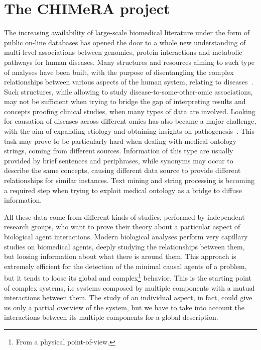 \documentclass{standalone}
\begin{document}
\section[CHIMeRA]{The CHIMeRA project}\label{chimera:chimera}

The increasing availability of large-scale biomedical literature under the form of public on-line databases has opened the door to a whole new understanding of multi-level associations between genomics, protein interactions and metabolic pathways for human diseases.
Many structures and resources aiming to such type of analyses have been built, with the purpose of disentangling the complex relationships between various aspects of the human system, relating to diseases~\cite{SymtomsNet, HumanPhenotype, chimerDB2017}.
Such structures, while allowing to study disease-to-some-other-omic associations, may not be sufficient when trying to bridge the gap of interpreting results and concepts proofing clinical studies, when many types of data are involved.
Looking for causation of diseases across different omics has also became a major challenge, with the aim of expanding etiology and obtaining insights on pathogenesis~\cite{Barabasi2007}.
This task may prove to be particularly hard when dealing with medical ontology strings, coming from different sources.
Information of this type are usually provided by brief sentences and periphrases, while synonyms may occur to describe the same concepts, causing different data source to provide different relationships for similar instances.
Text mining and string processing is becoming a required step when trying to exploit medical ontology as a bridge to diffuse information.

All these data come from different kinds of studies, performed by independent research groups, who want to prove their theory about a particular aspect of biological agent interactions.
Modern biological analyses perform very capillary studies on biomedical agents, deeply studying the relationships between them, but loosing information about what there is around them.
This approach is extremely efficient for the detection of the minimal causal agents of a problem, but it tends to loose its global and complex\footnote{
  From a physical point-of-view.
} behavior.
This is the starting point of complex systems, i.e systems composed by multiple components with a mutual interactions between them.
The study of an individual aspect, in fact, could give us only a partial overview of the system, but we have to take into account the interactions between its multiple components for a global description.
\end{document}
